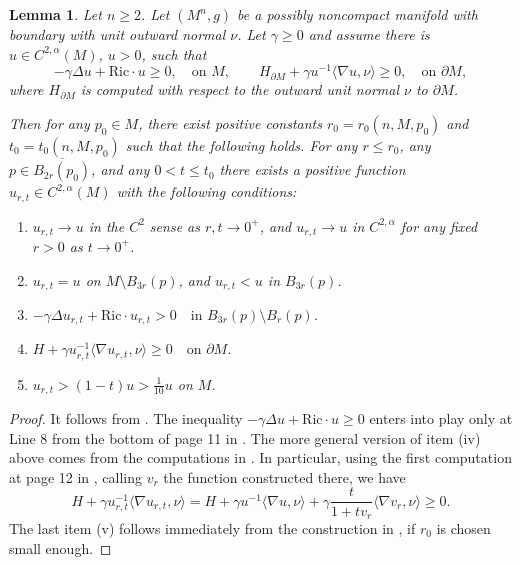 \documentclass[12pt,a4paper,reqno]{amsart}
\newtheorem{lemma}{Lemma}
\theoremstyle{definition}
\renewcommand{\leq}{\leqslant}
\renewcommand{\geq}{\geqslant}
\begin{document}
{\begin{lemma}\label{lemNewu}
Let $n\geq 2$. Let $(M^n,g)$ be a possibly noncompact manifold with boundary with unit outward normal $\nu$. Let $\gamma\geq 0$ and assume there is $u\in C^{2,\alpha}(M)$, $u>0$, such that 
\[
        -\gamma\Delta u+\mathrm{Ric} \cdot u\geq 0, \quad \text{on $M$}, \qquad H_{\partial M}+\gamma u^{-1}\langle \nabla u,\nu\rangle \geq 0, \quad \text{on $\partial M$},
\]
where $H_{\partial M}$ is computed with respect to the outward unit normal $\nu$ to $\partial M$.

Then for any $p_0 \in M$, there exist positive constants 
$r_0 = r_0(n,M,p_0)$ and $t_0 = t_0(n,M,p_0)$ such that the following holds. For any $r \leq r_0$, any $p \in \overline{B_{2r}(p_0)}$, and any $0 < t \leq t_0$ there exists a positive function $u_{r,t}\in C^{2,\alpha}(M)$ with the following conditions:
\begin{enumerate}[label=(\roman*)]
    \item $u_{r,t} \to u$ in the $C^2$ sense as $r,t \to 0^+$, and $u_{r,t} \to u$ in $C^{2,\alpha}$ for any fixed $r>0$ as $t \to 0^+$.
    \item $u_{r,t} = u$ on $M \setminus B_{3r}(p)$, and $u_{r,t} < u$ in $B_{3r}(p)$.
    \item $-\gamma \Delta u_{r,t} + \mathrm{Ric}\cdot u_{r,t} > 0 \quad \text{in } B_{3r}(p)\setminus B_r(p)$.
    \item $H+\gamma u_{r,t}^{-1}\langle \nabla u_{r,t},\nu\rangle \geq 0 \quad \text{on } \partial M$.
    \item $u_{r,t} > (1-t)  u > \frac{1}{10}u$ on $M$.
\end{enumerate}
\end{lemma}
\begin{proof}
    It follows from \cite[Lemma 3.3]{HongWang}. The inequality $-\gamma\Delta u+\mathrm{Ric}\cdot u\geq 0$ enters into play only at Line 8 from the bottom of page 11 in \cite{HongWang}. The more general version of item (iv) above comes from the computations in \cite{HongWang}. In particular, using the first computation at page 12 in \cite{HongWang}, calling $v_r$ the function constructed there, we have 
    \[
    H+\gamma u_{r,t}^{-1}\langle \nabla u_{r,t},\nu\rangle = H+\gamma u^{-1}\langle \nabla u,\nu\rangle + \gamma\frac{t}{1+tv_r}\langle \nabla v_r,\nu\rangle\geq 0.
    \]
    The last item (v) follows immediately from the construction  in \cite{HongWang}, if $r_0$ is chosen small enough.
\end{proof}

}
\end{document}
